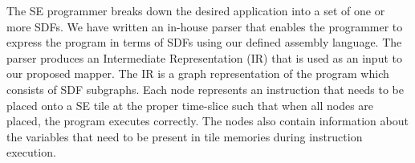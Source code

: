 The SE programmer breaks down the desired application into a set of one or more SDFs.
We have written an in-house parser that enables the programmer to express the program in terms of SDFs using our defined assembly language.
The parser produces an Intermediate Representation (IR) that is used as an input to our proposed mapper.
The IR is a graph representation of the program which consists of SDF subgraphs. 
Each node represents an instruction that needs to be placed onto a SE tile at the proper time-slice such that when all nodes are placed, the program executes correctly. 
The nodes also contain information about the variables that need to be present in tile memories during instruction execution. 

